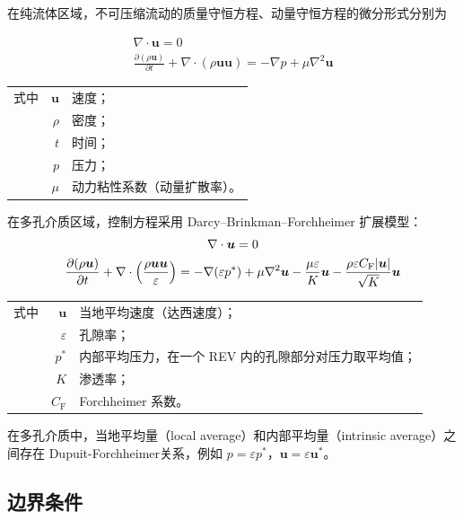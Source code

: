 在纯流体区域，不可压缩流动的质量守恒方程、动量守恒方程的微分形式分别为

\begin{gather}
	\nabla \cdot \bm{u} = 0 \\
	\frac{\partial(\rho\bm{u})}{\partial t} + \nabla \cdot (\rho\bm{u}\bm{u}) = -\nabla p + \mu\nabla^2\bm{u}
\end{gather}
\begin{tabularx}{\textwidth}{@{}l@{\quad}r@{——}X@{}}
	式中 & $\bm{u}$ & 速度；\\
		& $\rho$ & 密度；\\
		& $t$ & 时间；\\
		& $p$ & 压力；\\
		& $\mu$ & 动力粘性系数（动量扩散率）。
\end{tabularx}\vspace{3.15bp}


在多孔介质区域，控制方程采用 Darcy–Brinkman–Forchheimer 扩展模型：
\begin{gather}
	\nabla \cdot \bm{u} = 0 \\
	\frac{\partial(\rho\bm{u})}{\partial t} + 
	\nabla \cdot \left(\frac{\rho\bm{u}\bm{u}}{\varepsilon}\right) = 
	-\nabla (\varepsilon p^*) + \mu\nabla^2\bm{u} - 
	\frac{\mu\varepsilon}{K}\bm{u} - 
	\frac{\rho\varepsilon C_{\mathrm{F}}\lvert\bm{u}\vert}{\sqrt K}\bm{u}
\end{gather}
\begin{tabularx}{\textwidth}{@{}l@{\quad}r@{——}X@{}}
	式中 & $\bm{u}$ & 当地平均速度（达西速度）；\\
		& $\varepsilon$ & 孔隙率；\\
		& $p^*$ & 内部平均压力，在一个 REV 内的孔隙部分对压力取平均值；\\
		& $K$ & 渗透率；\\
		& $C_{\mathrm{F}}$ & Forchheimer 系数。
\end{tabularx}\vspace{3.15bp}
在多孔介质中，当地平均量（local average）和内部平均量（intrinsic average）之间存在 Dupuit-Forchheimer关系，例如 $p=\varepsilon p^*$，$\bm{u}=\varepsilon \bm{u}^*$。

\subsection{边界条件}

